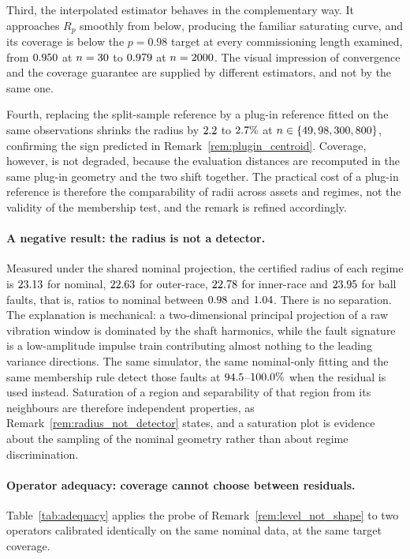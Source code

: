 \documentclass[a4paper]{cas-sc}
\begin{document}
Third, the interpolated estimator behaves in the complementary way. It
approaches \(R_p\) smoothly from below, producing the familiar saturating
curve, and its coverage is below the \(p=0.98\) target at every commissioning
length examined, from \(0.950\) at \(n=30\) to
\(0.979\) at \(n=2000\). The visual impression of
convergence and the coverage guarantee are supplied by different estimators,
and not by the same one.

Fourth, replacing the split-sample reference by a plug-in reference fitted on
the same observations shrinks the radius by \(2.2\) to
\(2.7\%\) at \(n\in\{49,98,300,800\}\), confirming the sign
predicted in Remark~\ref{rem:plugin_centroid}. Coverage, however, is not degraded, because
the evaluation distances are recomputed in the same plug-in geometry and the
two shift together. The practical cost of a plug-in reference is therefore the
comparability of radii across assets and regimes, not the validity of the
membership test, and the remark is refined accordingly.

\paragraph{A negative result: the radius is not a detector.}
Measured under the shared nominal projection, the certified radius of each
regime is \(23.13\) for nominal, \(22.63\) for outer-race,
\(22.78\) for inner-race and \(23.95\) for ball faults,
that is, ratios to nominal between \(0.98\) and \(1.04\). There
is no separation. The explanation is mechanical: a two-dimensional principal
projection of a raw vibration window is dominated by the shaft harmonics,
while the fault signature is a low-amplitude impulse train contributing almost
nothing to the leading variance directions. The same simulator, the same
nominal-only fitting and the same membership rule detect those faults at
\(94.5\)--\(100.0\%\) when the residual is used instead.
Saturation of a region and separability of that region from its neighbours are
therefore independent properties, as
Remark~\ref{rem:radius_not_detector} states, and a saturation plot is evidence
about the sampling of the nominal geometry rather than about regime
discrimination.

\paragraph{Operator adequacy: coverage cannot choose between residuals.}
Table~\ref{tab:adequacy} applies the probe of
Remark~\ref{rem:level_not_shape} to two operators calibrated identically on
the same nominal data, at the same target coverage.
\end{document}
